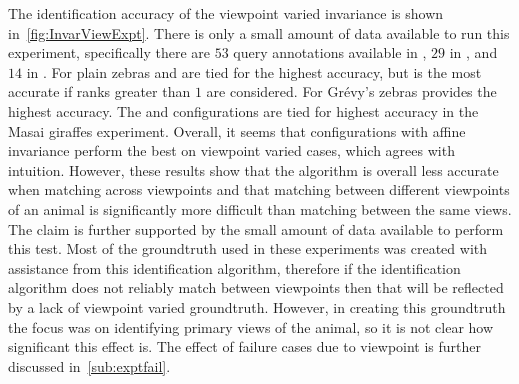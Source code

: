         \InvarExpt{}

        The identification accuracy of the viewpoint varied invariance is shown in~\cref{fig:InvarViewExpt}.
        There is only a small amount of data available to run this experiment, specifically there are $53$ query
          annotations available in \pzmasterI{}, $29$ in \gzall{}, and $14$ in \girmmasterI{}.
        For plain zebras \QRHCirc{} and \NoInvar{} are tied for the highest accuracy, but \QRHEll{} is the most
          accurate if ranks greater than $1$ are considered.
        For Grévy's zebras \AIAlone{} provides the highest accuracy.
        The \AIAlone{} and \QRHEll{} configurations are tied for highest accuracy in the Masai giraffes
          experiment.
        Overall, it seems that configurations with affine invariance perform the best on viewpoint varied cases,
          which agrees with intuition.
        However, these results show that the algorithm is overall less accurate when matching across viewpoints
          and that matching between different viewpoints of an animal is significantly more difficult than matching
          between the same views.
        The claim is further supported by the small amount of data available to perform this test.
        Most of the groundtruth used in these experiments was created with assistance from this identification
          algorithm, therefore if the identification algorithm does not reliably match between viewpoints then that
          will be reflected by a lack of viewpoint varied groundtruth.
        However, in creating this groundtruth the focus was on identifying primary views of the animal, so it is
          not clear how significant this effect is.
        The effect of failure cases due to viewpoint is further discussed in~\cref{sub:exptfail}.

        \InvarViewExpt{}

        \kptstype{}


